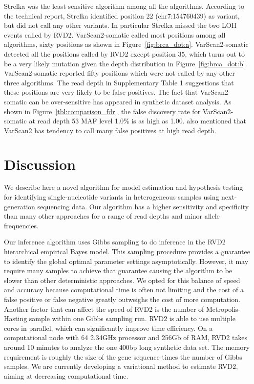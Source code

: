 \documentclass{bioinfo}
\begin{document}
Strelka was the least sensitive algorithm among all the algorithms. According to the technical report, Strelka identified position 22 (chr7:154760439) as variant, but did not call any other variants. In particular Strelka missed the two LOH events called by RVD2. VarScan2-somatic called most positions among all algorithms, sixty positions as shown in Figure~\ref{fig:brca_dot:a}. VarScan2-somatic  detected all the positions called by RVD2 except position 35, which turns out to be a very likely mutation given the depth distribution in Figure~\ref{fig:brca_dot:b}. VarScan2-somatic reported fifty positions which were not called by any other three algorithms. The read depth in Supplementary Table 1 suggestions that these positions are very likely to be false positives. The fact that VarScan2-somatic can be over-sensitive has appeared in synthetic dataset analysis. As shown in Figure~\ref{tbl:comparison_fdr}, the false discovery rate for VarScan2-somatic at read depth 53 MAF level 1.0\% is as high as 1.00.  \citet{spencer2013performance} also mentioned that VarScan2 has tendency to call many false positives at high read depth. 
\vspace{-5pt}
\section{Discussion}
We describe here a novel algorithm for model estimation and hypothesis testing for identifying single-nucleotide variants in heterogeneous samples using next-generation sequencing data. Our algorithm has a higher sensitivity and specificity than many other approaches for a range of read depths and minor allele frequencies.

Our inference algorithm uses Gibbs sampling to do inference in the RVD2 hierarchical empirical Bayes model. This sampling procedure provides a guarantee to identify the global optimal parameter settings asymptotically. However, it may require many samples to achieve that guarantee causing the algorithm to be slower than other deterministic approaches. We opted for this balance of speed and accuracy because computational time is often not limiting and the cost of a false positive or false negative greatly outweighs the cost of more computation. Another factor that can affect the speed of RVD2 is the number of Metropolis-Hasting sample within one Gibbs sampling run. RVD2 is able to use multiple cores in parallel, which can significantly improve time efficiency. On a computational node with 64 2.34GHz processor and 256Gb of RAM, RVD2 takes around 10 minutes to analyze the one 400bp long synthetic data set. The memory requirement is roughly the size of the gene sequence times the number of Gibbs samples. We are currently developing a variational method to estimate RVD2, aiming at decreasing computational time. 
\end{document}
